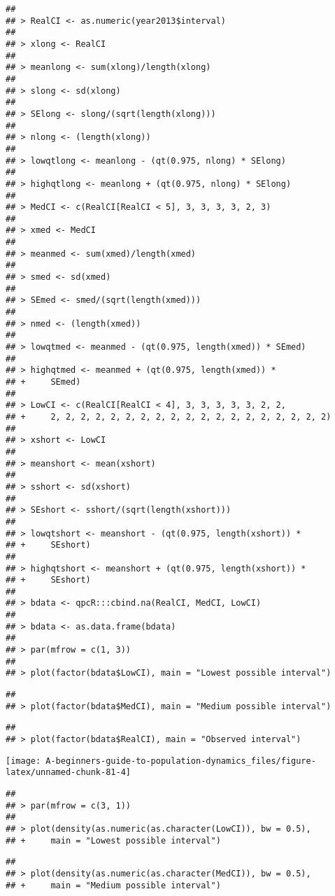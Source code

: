 \documentclass[]{book}
\begin{document}
\begin{verbatim}
## 
## > RealCI <- as.numeric(year2013$interval)
## 
## > xlong <- RealCI
## 
## > meanlong <- sum(xlong)/length(xlong)
## 
## > slong <- sd(xlong)
## 
## > SElong <- slong/(sqrt(length(xlong)))
## 
## > nlong <- (length(xlong))
## 
## > lowqtlong <- meanlong - (qt(0.975, nlong) * SElong)
## 
## > highqtlong <- meanlong + (qt(0.975, nlong) * SElong)
## 
## > MedCI <- c(RealCI[RealCI < 5], 3, 3, 3, 3, 2, 3)
## 
## > xmed <- MedCI
## 
## > meanmed <- sum(xmed)/length(xmed)
## 
## > smed <- sd(xmed)
## 
## > SEmed <- smed/(sqrt(length(xmed)))
## 
## > nmed <- (length(xmed))
## 
## > lowqtmed <- meanmed - (qt(0.975, length(xmed)) * SEmed)
## 
## > highqtmed <- meanmed + (qt(0.975, length(xmed)) * 
## +     SEmed)
## 
## > LowCI <- c(RealCI[RealCI < 4], 3, 3, 3, 3, 3, 2, 2, 
## +     2, 2, 2, 2, 2, 2, 2, 2, 2, 2, 2, 2, 2, 2, 2, 2, 2, 2, 2)
## 
## > xshort <- LowCI
## 
## > meanshort <- mean(xshort)
## 
## > sshort <- sd(xshort)
## 
## > SEshort <- sshort/(sqrt(length(xshort)))
## 
## > lowqtshort <- meanshort - (qt(0.975, length(xshort)) * 
## +     SEshort)
## 
## > highqtshort <- meanshort + (qt(0.975, length(xshort)) * 
## +     SEshort)
## 
## > bdata <- qpcR:::cbind.na(RealCI, MedCI, LowCI)
## 
## > bdata <- as.data.frame(bdata)
## 
## > par(mfrow = c(1, 3))
## 
## > plot(factor(bdata$LowCI), main = "Lowest possible interval")
\end{verbatim}

\begin{verbatim}
## 
## > plot(factor(bdata$MedCI), main = "Medium possible interval")
\end{verbatim}

\begin{verbatim}
## 
## > plot(factor(bdata$RealCI), main = "Observed interval")
\end{verbatim}

\begin{center}\texttt{[image: A-beginners-guide-to-population-dynamics\_files/figure-latex/unnamed-chunk-81-4]} \end{center}

\begin{verbatim}
## 
## > par(mfrow = c(3, 1))
## 
## > plot(density(as.numeric(as.character(LowCI)), bw = 0.5), 
## +     main = "Lowest possible interval")
\end{verbatim}

\begin{verbatim}
## 
## > plot(density(as.numeric(as.character(MedCI)), bw = 0.5), 
## +     main = "Medium possible interval")
\end{verbatim}
\end{document}
